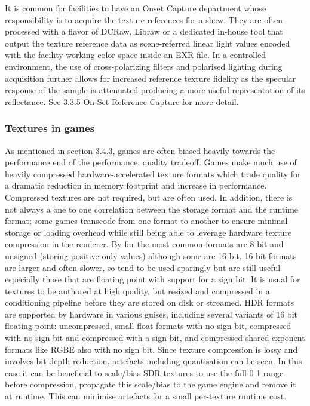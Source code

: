 It is common for facilities to have an Onset Capture department whose responsibility is to acquire the texture references for a show. They are often processed with a flavor of DCRaw, Libraw or a dedicated in-house tool that output the texture reference data as scene-referred linear light values encoded with the facility working color space inside an EXR file. In a controlled environment, the use of cross-polarizing filters and polarised lighting during acquisition further allows for increased reference texture fidelity as the specular response of the sample is attenuated producing a more useful representation of its reflectance. See 3.3.5 On-Set Reference Capture for more detail.

\subsubsection{Textures in games}
As mentioned in section 3.4.3, games are often biased heavily towards the performance end of the performance, quality tradeoff. Games make much use of heavily compressed hardware-accelerated texture formats which trade quality for a dramatic reduction in memory footprint and increase in performance.
Compressed textures are not required, but are often used. In addition, there is not always a one to one correlation between the storage format and the runtime format; some games transcode from one format to another to ensure minimal storage or loading overhead while still being able to leverage hardware texture compression in the renderer.
By far the most common formats are 8 bit and unsigned (storing positive-only values) although some are 16 bit. 16 bit formats are larger and often slower, so tend to be used sparingly but are still useful especially those that are floating point with support for a sign bit. It is usual for textures to be authored at high quality, but resized and compressed in a conditioning pipeline before they are stored on disk or streamed.
HDR formats are supported by hardware in various guises, including several variants of 16 bit floating point: uncompressed, small float formats with no sign bit, compressed with no sign bit and compressed with a sign bit, and compressed shared exponent formats like RGBE also with no sign bit.
Since texture compression is lossy and involves bit depth reduction, artefacts including quantisation can be seen. In this case it can be beneficial to scale/bias SDR textures to use the full 0-1 range before compression, propagate this scale/bias to the game engine and remove it at runtime. This can minimise artefacts for a small per-texture runtime cost. 
